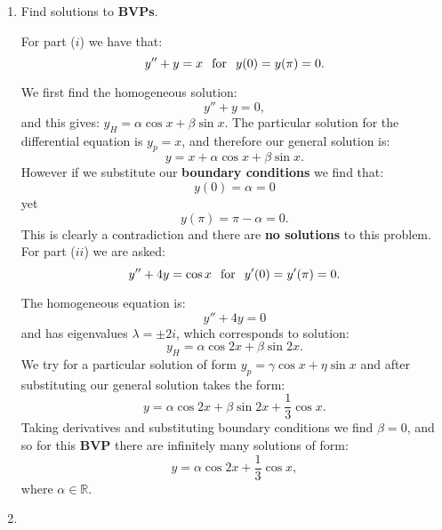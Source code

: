 \pagestyle{fancy}
\fancyhead{}

\begin{enumerate}
    \item Find solutions to \textbf{BVPs}.

    For part ($i$) we have that:
    $$y''+y=x\hspace{0.1in}\text{for}\hspace{0.1in}y(0)=y(\pi)=0.$$
    
    We first find the homogeneous solution:
    $$y''+y=0,$$
    and this gives:
    $y_H=\alpha\cos x+\beta\sin x$. The particular solution for the differential equation is $y_p=x$, and therefore our general solution is:
    $$y=x+\alpha\cos x+\beta\sin x.$$
    However if we substitute our \textbf{boundary conditions} we find that:
    $$y(0)=\alpha=0$$
    yet
    $$y(\pi)=\pi-\alpha=0.$$
    This is clearly a contradiction and there are \textbf{no solutions} to this problem. \\

    For part ($ii$) we are asked:
    $$y''+4y=\cos x\hspace{0.1in}\text{for}\hspace{0.1in}y'(0)=y'(\pi)=0.$$

    The homogeneous equation is:
    $$y''+4y=0$$
    and has eigenvalues $\lambda=\pm 2i$, which corresponds to solution:
    $$y_H=\alpha\cos 2x+\beta\sin 2x.$$
    We try for a particular solution of form $y_p=\gamma\cos x+\eta\sin x$ and after substituting our general solution takes the form:
    $$y=\alpha\cos 2x+\beta\sin 2x+\frac{1}{3}\cos x.$$
    Taking derivatives and substituting boundary conditions we find $\beta=0$,
    and so for this \textbf{BVP} there are infinitely many solutions of form:
    $$y=\alpha\cos 2x+\frac{1}{3}\cos x,$$
    where $\alpha\in\mathbb{R}$.

    \newpage

    \item
\end{enumerate}